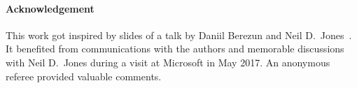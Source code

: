 \documentclass{elsarticle}
\theoremstyle{plain}
\theoremstyle{definition}
\begin{document}
%






\paragraph{Acknowledgement}
This work got inspired by slides of a talk by Daniil Berezun and
Neil D.~Jones~\cite{berezunjones_partialevalbytraversals}. It benefited from  communications with the authors and memorable discussions with Neil D.~Jones during a visit at Microsoft in May 2017.
An anonymous referee provided valuable comments.


\end{document}
